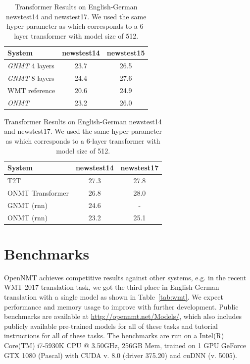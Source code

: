\documentclass[]{article}
\begin{document}
\begin{table}
\parbox{.48\linewidth}{
\centering
\begin{tabular}{l cc}
          \toprule
            { System} & { newstest14}  & newstest15\\
            \midrule
            \textit{GNMT} 4 layers & 23.7 & 26.5 \\
            \textit{GNMT} 8 layers & 24.4 & 27.6 \\
            WMT reference & 20.6 & 24.9 \\
            \textit{ONMT} & 23.2 & 26.0 \\
            \bottomrule
          \end{tabular}
          \caption{\label{tab:results-google}Comparison with \textit{GNMT} on English-German \emph{newstest14} and \emph{newstest15}. \textit{ONMT} used 2-layers bi-directional RNN of 1024, word embedding size 512, dropout 0.1 and maximum sequence length 100.}
}
\hfill
\parbox{.48\linewidth}{
\centering
\begin{tabular}{l cc}
          \toprule
            { System} & { newstest14}  & newstest17\\
            \midrule
            T2T  & 27.3 & 27.8 \\
            ONMT Transformer& 26.8 & 28.0 \\
            GNMT (rnn) & 24.6 & - \\
            ONMT (rnn) & 23.2 & 25.1 \\
            \bottomrule
          \end{tabular}
          \caption{\label{tab:results-transformer}Transformer Results on English-German newstest14 and newstest17. We used the same hyper-parameter as \cite{hieber2017sockeye} which corresponds to a 6-layer transformer with model size of 512.}
}
\end{table}

\section{Benchmarks}

OpenNMT achieves competitive results against other systems, e.g. in the recent WMT 2017 translation task, we got the third place in English-German translation with a single model as shown in Table~\ref{tab:wmt}. We expect performance and
memory usage to improve with further development.  Public benchmarks
are available at \url{http://opennmt.net/Models/}, which also includes
publicly available pre-trained models for all of these tasks and
tutorial instructions for all of these tasks. The benchmarks are
run on a Intel(R) Core(TM) i7-5930K CPU @ 3.50GHz, 256GB Mem,
trained on 1 GPU GeForce GTX 1080 (Pascal) with CUDA v. 8.0 (driver
375.20) and cuDNN (v. 5005).
\end{document}

